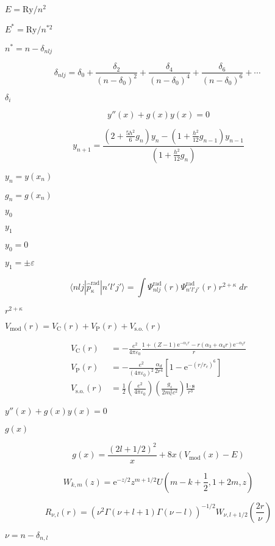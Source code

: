\documentclass{article}
\begin{document}
$ E = \mathrm{Ry}/n^2 $
\pagebreak

$ E^* = \mathrm{Ry}/n^{*2} $
\pagebreak

$ n^* = n - \delta_{nlj} $
\pagebreak

\[ \delta_{nlj} = \delta_0 + \frac{\delta_2}{(n-\delta_0)^2} + \frac{\delta_4}{(n-\delta_0)^4} + \frac{\delta_6}{(n-\delta_0)^6} + \cdots \; \]
\pagebreak

$ \delta_i $
\pagebreak

\[ y''(x) + g(x)y(x) = 0 \]
\pagebreak

\[ y_{n+1} = \frac{\left( 2 + \frac{5 h^2}{6} g_n \right) y_n - \left( 1 + \frac{h^2}{12} g_{n-1} \right) y_{n-1}}{\left( 1 + \frac{h^2}{12} g_n \right)} \]
\pagebreak

$ y_n = y(x_n) $
\pagebreak

$ g_n = g(x_n) $
\pagebreak

$ y_0 $
\pagebreak

$ y_1 $
\pagebreak

$ y_0 = 0 $
\pagebreak

$ y_1 = \pm\varepsilon $
\pagebreak

\[ \langle nlj| \hat{p}^{\mathrm{rad}}_\kappa |n'l'j' \rangle = \int \Psi^{\text{rad}}_{nlj}(r) \Psi^{\text{rad}}_{n'l'j'}(r) r^{2+\kappa} \; dr \]
\pagebreak

$ r^{2+\kappa} $
\pagebreak

$ V_{\mathrm{mod}}(r) = V_{\mathrm{C}}(r) + V_{\mathrm{P}}(r) + V_{\mathrm{s.o.}}(r) $
\pagebreak

\[ \begin{aligned} V_{\mathrm{C}}(r) &= - \frac{e^2}{4\pi\varepsilon_0} \frac{1 + (Z-1)\mathrm{e}^{-\alpha_1 r} - r(\alpha_3+\alpha_4 r)\mathrm{e}^{-\alpha_2 r}}{r} \\ V_{\mathrm{P}}(r) &= -\frac{e^2}{(4\pi\varepsilon_0)^2} \frac{\alpha_d}{2 r^4} \left[ 1 - \mathrm{e}^{-(r/r_c)^6} \right] \\ V_{\mathrm{s.o.}}(r) &= \frac{1}{2} \left( \frac{e^2}{4\pi\varepsilon_0} \right) \left( \frac{g_s}{2 m_e^2 c^2} \right) \frac{\boldsymbol{l}\cdot\boldsymbol{s}}{r^3} \end{aligned} \]
\pagebreak

$ y''(x) + g(x) y(x) = 0$
\pagebreak

$ g(x) $
\pagebreak

\[ g(x) = \frac{(2 l + 1/2)^2}{x} + 8 x (V_{\mathrm{mod}}(x) - E) \]
\pagebreak

\[ W_{k,m}(z) = \mathrm{e}^{-z/2} z^{m+1/2} U\left(m-k+\frac{1}{2}, 1+2m, z\right) \]
\pagebreak

\[ R_{\nu,l}(r) = (\nu^2 \Gamma(\nu+l+1) \Gamma(\nu-l))^{-1/2} W_{\nu, l+1/2}\left(\frac{2r}{\nu}\right) \]
\pagebreak

$ \nu = n - \delta_{n,l} $
\pagebreak
\end{document}
